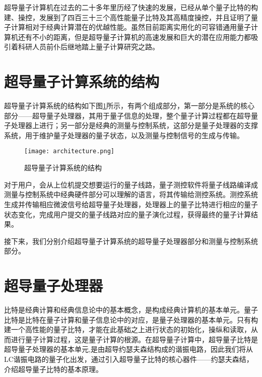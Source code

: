 超导量子计算机在过去的二十多年里历经了快速的发展，已经从单个量子比特的构建、操控，发展到了四百三十三个高性能量子比特及其高精度操控，并且证明了量子计算相对于经典计算潜在的优越性能。虽然目前距离实用化的可容错通用量子计算机还有不小的距离，但是超导量子计算机的高速发展和巨大的潜在应用能力都吸引着科研人员前仆后继地踏上量子计算研究之路。
\section{超导量子计算系统的结构}
超导量子计算系统的结构如下图\ref{fig:architecture}所示，有两个组成部分，第一部分是系统的核心部分——超导量子处理器，其用于量子信息的处理，整个量子计算过程都在超导量子处理器上进行；另一部分是经典的测量与控制系统，这部分是量子处理器的支撑系统，用于维护量子处理器的量子状态，以及测量与控制信号的生成与传输。

\begin{figure}[h]
	\centering
	\texttt{[image: architecture.png]}
	\caption{超导量子计算系统的结构}
	\label{fig:architecture}
\end{figure}

对于用户，会从上位机提交想要运行的量子线路，量子测控软件将量子线路编译成测量与控制系统中经典硬件部分可以理解的语言，将其传输给测控系统。测控系统生成并传输相应微波信号给超导量子处理器，处理器上的量子比特进行相应的量子状态变化，完成用户提交的量子线路对应的量子演化过程，获得最终的量子计算结果。

接下来，我们分别介绍超导量子计算系统的超导量子处理器部分和测量与控制系统部分。
\section{超导量子处理器}
比特是经典计算和经典信息论中的基本概念，是构成经典计算机的基本单元。量子比特是比特在量子计算和量子信息论中的对应，是量子处理器的基本单元。只有构建一个高性能的量子比特，才能在此基础之上进行状态的初始化，操纵和读取，从而进行量子计算过程，这是量子计算的根源。在超导量子计算中，超导量子比特是超导量子处理器的基本单元,是由超导约瑟夫森结构成的谐振电路，因此我们将从LC谐振电路的量子化出发，通过引入超导量子比特的核心器件——约瑟夫森结，介绍超导量子比特的基本原理。
